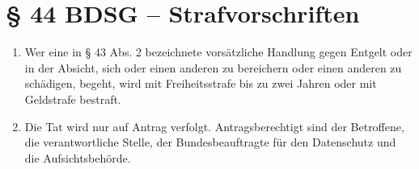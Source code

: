 \documentclass[DIV=12,BCOR=1.5cm]{scrartcl}
\begin{document}
\section{§ 44 BDSG -- Strafvorschriften}
\begin{enumerate}
	\setlength{\itemsep}{-2pt}
\item Wer eine in § 43 Abs. 2 bezeichnete vorsätzliche Handlung gegen Entgelt oder in der Absicht, sich oder einen anderen zu bereichern oder einen anderen zu schädigen, begeht, wird mit Freiheitsstrafe bis zu zwei Jahren oder mit Geldstrafe bestraft. 

\item Die Tat wird nur auf Antrag verfolgt. Antragsberechtigt sind der Betroffene, die verantwortliche Stelle, der Bundesbeauftragte für den Datenschutz und die Aufsichtsbehörde.
\end{enumerate}
\end{document}
